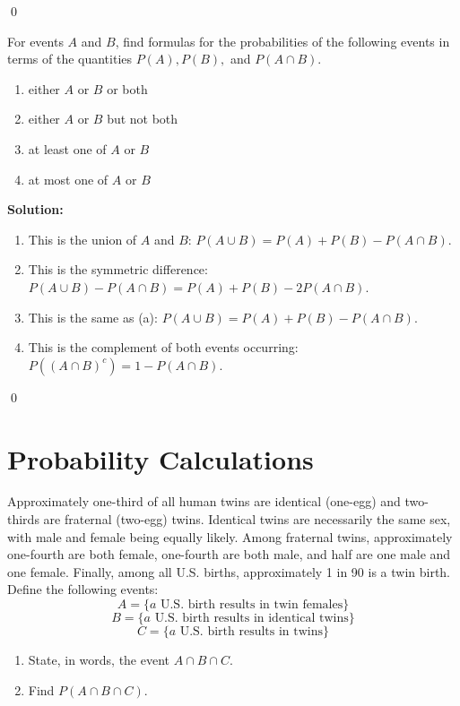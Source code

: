 \qed
\begin{problembox}
For events $A$ and $B$, find formulas for the probabilities of the following events in terms of the quantities $P(A), P(B),$ and $P(A \cap B)$.
\begin{enumerate}[label=(\alph*)]
    \item either $A$ or $B$ or both
    \item either $A$ or $B$ but not both
    \item at least one of $A$ or $B$
    \item at most one of $A$ or $B$
\end{enumerate}
\end{problembox}

\noindent\textbf{Solution:}
\begin{enumerate}[label=(\alph*)]
    \item This is the union of $A$ and $B$: $P(A \cup B) = P(A) + P(B) - P(A \cap B)$.
    
    \item This is the symmetric difference: $P(A \cup B) - P(A \cap B) = P(A) + P(B) - 2P(A \cap B)$.
    
    \item This is the same as (a): $P(A \cup B) = P(A) + P(B) - P(A \cap B)$.
    
    \item This is the complement of both events occurring: $P((A \cap B)^c) = 1 - P(A \cap B)$.
\end{enumerate}



\qed
\section{Probability Calculations}

\begin{problembox}
Approximately one-third of all human twins are identical (one-egg) and two-thirds are fraternal (two-egg) twins. Identical twins are necessarily the same sex, with male and female being equally likely. Among fraternal twins, approximately one-fourth are both female, one-fourth are both male, and half are one male and one female. Finally, among all U.S. births, approximately 1 in 90 is a twin birth. Define the following events:
\[ A = \{a \text{ U.S. birth results in twin females}\} \]
\[ B = \{a \text{ U.S. birth results in identical twins}\} \]
\[ C = \{a \text{ U.S. birth results in twins}\} \]
\begin{enumerate}[label=(\alph*)]
    \item State, in words, the event $A \cap B \cap C$.
    \item Find $P(A \cap B \cap C)$.
\end{enumerate}
\end{problembox}

